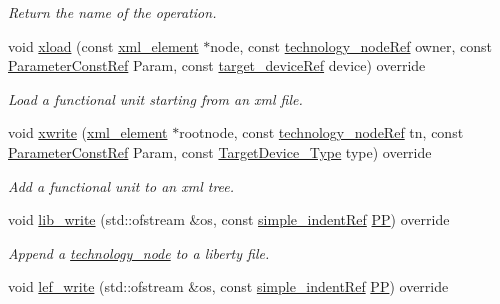 \begin{DoxyCompactItemize}
\begin{DoxyCompactList}\small\item\em Return the name of the operation. \end{DoxyCompactList}\item 
void \hyperlink{structfunctional__unit_ae93d5279bbc04feec0a49a79734d9a28}{xload} (const \hyperlink{classxml__element}{xml\+\_\+element} $\ast$node, const \hyperlink{technology__node_8hpp_a33dd193b7bd6b987bf0d8a770a819fa7}{technology\+\_\+node\+Ref} owner, const \hyperlink{Parameter_8hpp_a37841774a6fcb479b597fdf8955eb4ea}{Parameter\+Const\+Ref} Param, const \hyperlink{target__device_8hpp_acedb2b7a617e27e6354a8049fee44eda}{target\+\_\+device\+Ref} device) override
\begin{DoxyCompactList}\small\item\em Load a functional unit starting from an xml file. \end{DoxyCompactList}\item 
void \hyperlink{structfunctional__unit_a49837b741da6b92962511fc1d3d20ff0}{xwrite} (\hyperlink{classxml__element}{xml\+\_\+element} $\ast$rootnode, const \hyperlink{technology__node_8hpp_a33dd193b7bd6b987bf0d8a770a819fa7}{technology\+\_\+node\+Ref} tn, const \hyperlink{Parameter_8hpp_a37841774a6fcb479b597fdf8955eb4ea}{Parameter\+Const\+Ref} Param, const \hyperlink{target__device_8hpp_a476becc690220f0805ce73006449c732}{Target\+Device\+\_\+\+Type} type) override
\begin{DoxyCompactList}\small\item\em Add a functional unit to an xml tree. \end{DoxyCompactList}\item 
void \hyperlink{structfunctional__unit_aded00fb1bbe01e59c625772678b61f01}{lib\+\_\+write} (std\+::ofstream \&os, const \hyperlink{simple__indent_8hpp_ad85cff64e49d5dbf5cefe96f411c720e}{simple\+\_\+indent\+Ref} \hyperlink{structtechnology__node_ae6edfff0ccd2700b5de9fb538536977a}{PP}) override
\begin{DoxyCompactList}\small\item\em Append a \hyperlink{structtechnology__node}{technology\+\_\+node} to a liberty file. \end{DoxyCompactList}\item 
void \hyperlink{structfunctional__unit_a3e77b0b684c72195d55d1aa2144641c1}{lef\+\_\+write} (std\+::ofstream \&os, const \hyperlink{simple__indent_8hpp_ad85cff64e49d5dbf5cefe96f411c720e}{simple\+\_\+indent\+Ref} \hyperlink{structtechnology__node_ae6edfff0ccd2700b5de9fb538536977a}{PP}) override

\end{DoxyCompactItemize}
